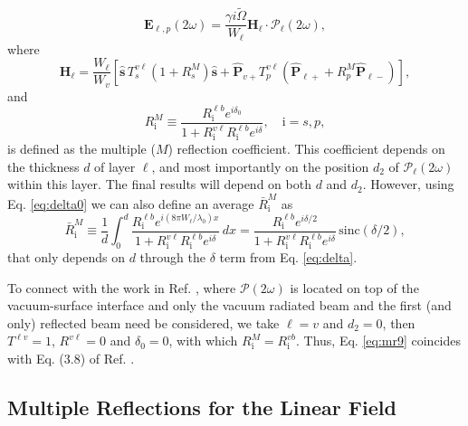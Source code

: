 \documentclass[aps,pra,10pt,amsmath,notitlepage,letterpaper]{revtex4-1}
\begin{document}
\begin{equation}\label{eq:mr8}
\mathbf{E}_{\ell,p}(2\omega) =
\frac{\gamma i\tilde{\Omega}}{W_{\ell}}\mathbf{H}_{\ell}\cdot
\boldsymbol{\mathcal{P}}_{\ell}(2\omega),
\end{equation}
where
\begin{equation}\label{eq:mr9}
\mathbf{H}_{\ell}
= \frac{W_\ell}{W_v}
\left[
\hat{\mathbf{s}}\,T_{s}^{v\ell}
\left(1+ R^{M}_{s}\right)\hat{\mathbf{s}} + \hat{\mathbf{P}}_{v+}T_{p}^{v\ell}
\left(\hat{\mathbf{P}}_{\ell +} + R^{M}_{p}\hat{\mathbf{P}}_{\ell -}\right)
\right],
\end{equation}
and
\begin{equation}\label{m61}
R^{M}_{\mathrm{i}}\equiv
\frac{R^{\ell b}_{\mathrm{i}}e^{i\delta_{0}}}
     {1+R^{v\ell}_{\mathrm{i}} R^{\ell b}_{\mathrm{i}}e^{i\delta}},
     \quad \mathrm{i}=s,p,
\end{equation}
is defined as the multiple ($M$) reflection coefficient. This coefficient
depends on the thickness $d$ of layer $\ell$, and most importantly on the
position $d_{2}$ of $\boldsymbol{\mathcal{P}}_{\ell}(2\omega)$ within this
layer. The final results will depend on both $d$ and $d_{2}$. However, using Eq.
\eqref{eq:delta0} we can also define an average $\bar{R}^{M}_{\mathrm{i}}$ as
\begin{equation}\label{eq:mcave}
\bar{R}^{M}_{\mathrm{i}}\equiv 
\frac{1}{d}\int_{0}^{d}
\frac{R^{\ell b}_{\mathrm{i}}e^{i(8\pi W_{\ell}/\lambda_{0})x}}
{1 + R^{v\ell}_{\mathrm{i}}R^{\ell b}_{\mathrm{i}}e^{i\delta}}\,dx
= \frac{R^{\ell b}_{\mathrm{i}}e^{i\delta/2}}
{1 + R^{v\ell}_{\mathrm{i}}R^{\ell b}_{\mathrm{i}}e^{i\delta}}
\,\mathrm{sinc}(\delta/2),
\end{equation}
that only depends on $d$ through the $\delta$ term from Eq. \eqref{eq:delta}.

To connect with the work in Ref. \cite{mizrahiJOSA88}, where
$\boldsymbol{\mathcal{P}}(2\omega)$ is located on top of the vacuum-surface
interface and only the vacuum radiated beam and the first (and only) reflected
beam need be considered, we take $\ell = v$ and $d_{2} = 0$, then $T^{\ell v} =
1$, $R^{v\ell} = 0$ and $\delta_{0} = 0$, with which $R^{M}_{\mathrm{i}} =
R^{vb}_{\mathrm{i}}$. Thus, Eq. \eqref{eq:mr9} coincides with Eq. (3.8) of Ref.
\cite{mizrahiJOSA88}.



\subsection{Multiple Reflections for the Linear Field}
\end{document}

